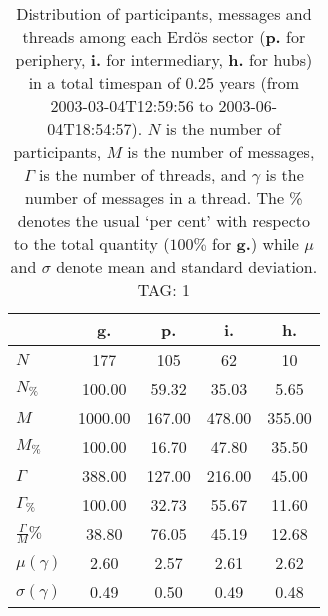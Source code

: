 \begin{table}[h!]
\begin{center}
\begin{tabular}{| l || c | c | c | c |}\hline
 & {\bf g.} & {\bf p.} & {\bf i.} & {\bf h.} \\\hline\hline
$N$ & 177  & 105  & 62  & 10 \\
$N_{\%}$ & 100.00  & 59.32  & 35.03  & 5.65 \\\hline
$M$ & 1000.00  & 167.00  & 478.00  & 355.00 \\
$M_{\%}$ & 100.00  & 16.70  & 47.80  & 35.50 \\\hline
$\Gamma$ & 388.00  & 127.00  & 216.00  & 45.00 \\
$\Gamma_{\%}$ & 100.00  & 32.73  & 55.67  & 11.60 \\\hline
$\frac{\Gamma}{M}\%$ & 38.80  & 76.05  & 45.19  & 12.68 \\
$\mu(\gamma)$ & 2.60  & 2.57  & 2.61  & 2.62 \\
$\sigma(\gamma)$ & 0.49  & 0.50  & 0.49  & 0.48 \\\hline
\end{tabular}
\caption{Distribution of participants, messages and threads among each Erd\"os sector ({\bf p.} for periphery, {\bf i.} for intermediary, 
    {\bf h.} for hubs) in a total timespan of 0.25 years (from 2003-03-04T12:59:56 to 2003-06-04T18:54:57). $N$ is the number of participants, $M$ is the number of messages, $\Gamma$ is the number of threads, and $\gamma$ is the number of messages in a thread.
    The \% denotes the usual `per cent' with respecto to the total quantity ($100\%$ for {\bf g.})
    while $\mu$ and $\sigma$ denote mean and standard deviation. TAG: 1}
\end{center}
\end{table}